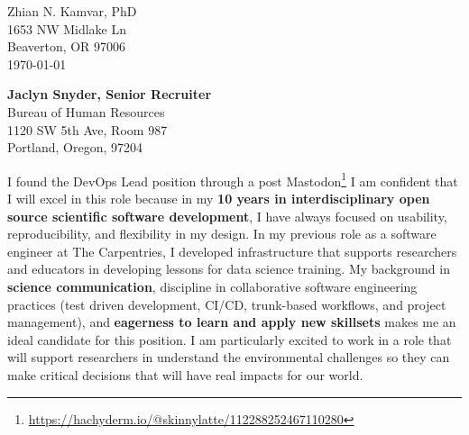 


\clearpage
\begin{flushright}
  Zhian N. Kamvar, PhD\\
  1653 NW Midlake Ln\\
  Beaverton, OR 97006\\
  \today
\end{flushright}

\textbf{Jaclyn Snyder, Senior Recruiter}\\
Bureau of Human Resources\\
1120 SW 5th Ave, Room 987\\
Portland, Oregon, 97204 

\vspace{2ex}

I found the DevOps Lead position through a post 
Mastodon\footnote{\url{https://hachyderm.io/@skinnylatte/112288252467110280}} 
I am confident that I will excel in
this role because in my \textbf{10 years in interdisciplinary open source
scientific software development}, I have always focused on usability,
reproducibility, and flexibility in my design.
In my previous role as a software engineer at The Carpentries, I developed
infrastructure that supports researchers and educators in developing lessons
for data science training.
My background in \textbf{science communication}, discipline in collaborative
software engineering practices (test driven development, CI/CD, trunk-based
workflows, and project management), and \textbf{eagerness to learn and apply
new skillsets} makes me an ideal candidate for this position. 
I am particularly excited to work in a role that will support researchers in
understand the environmental challenges so they can make critical decisions
that will have real impacts for our world.



\vspace{2ex}

